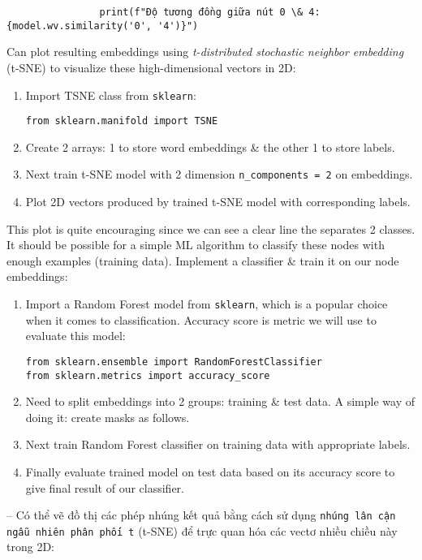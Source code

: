\documentclass{article}
\begin{document}
\begin{itemize}
\begin{itemize}
\begin{enumerate}
\begin{verbatim}
                print(f"Độ tương đồng giữa nút 0 \& 4: {model.wv.similarity('0', '4')}")
            \end{verbatim}
        \end{enumerate}
        Can plot resulting embeddings using {\it t-distributed stochastic neighbor embedding} (t-SNE) to visualize these high-dimensional vectors in 2D:
        \begin{enumerate}
            \item Import TSNE class from {\tt sklearn}:
            \begin{verbatim}
from sklearn.manifold import TSNE
            \end{verbatim}
            \item Create 2 arrays: 1 to store word embeddings \& the other 1 to store labels.
            \item Next train t-SNE model with 2 dimension \verb|n_components = 2| on embeddings.
            \item Plot 2D vectors produced by trained t-SNE model with corresponding labels.
        \end{enumerate}
        This plot is quite encouraging since we can see a clear line the separates 2 classes. It should be possible for a simple ML algorithm to classify these nodes with enough examples (training data). Implement a classifier \& train it on our node embeddings:
        \begin{enumerate}
            \item Import a Random Forest model from {\tt sklearn}, which is a popular choice when it comes to classification. Accuracy score is metric we will use to evaluate this model:
            \begin{verbatim}
from sklearn.ensemble import RandomForestClassifier
from sklearn.metrics import accuracy_score
            \end{verbatim}
            \item Need to split embeddings into 2 groups: training \& test data. A simple way of doing it: create masks as follows.
            \item Next train Random Forest classifier on training data with appropriate labels.
            \item Finally evaluate trained model on test data based on its accuracy score to give final result of our classifier.
        \end{enumerate}
        -- Có thể vẽ đồ thị các phép nhúng kết quả bằng cách sử dụng {\tt nhúng lân cận ngẫu nhiên phân phối t} (t-SNE) để trực quan hóa các vectơ nhiều chiều này trong 2D:

\end{itemize}
\end{itemize}
\end{document}
